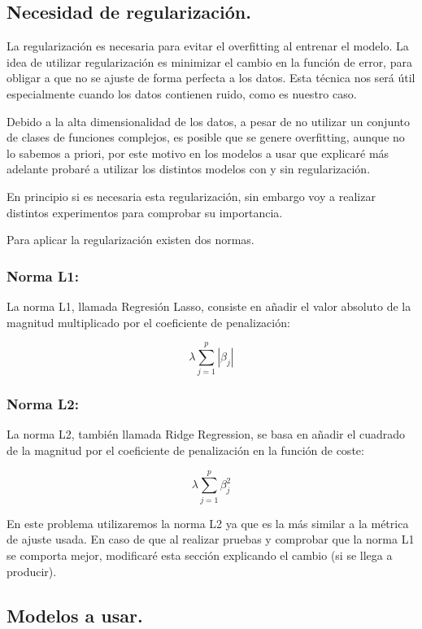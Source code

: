 \documentclass[12pt, spanish]{article}
\begin{document}
\subsection{Necesidad de regularización.}

La regularización es necesaria para evitar el overfitting al entrenar el modelo. La idea de utilizar regularización es minimizar el cambio en la función de error, para obligar a que no se ajuste de forma perfecta a los datos. Esta técnica nos será útil especialmente cuando los datos contienen ruido, como es nuestro caso.

Debido a la alta dimensionalidad de los datos, a pesar de no utilizar un conjunto de clases de funciones complejos, es posible que se genere overfitting, aunque no lo sabemos a priori, por este motivo en los modelos a usar que explicaré más adelante probaré a utilizar los distintos modelos con y sin regularización.

En principio si es necesaria esta regularización, sin embargo voy a realizar distintos experimentos para comprobar su importancia.

Para aplicar la regularización existen dos normas\cite{l1l2regularizacion}.


\subsubsection{Norma L1: }

La norma L1, llamada Regresión Lasso, consiste en añadir el valor absoluto de la magnitud multiplicado por el coeficiente de penalización:

$$ \lambda \sum_{j=1}^{p}{|\beta_j|} $$

\subsubsection{Norma L2:}

La norma L2, también llamada Ridge Regression, se basa en añadir el cuadrado de la magnitud por el coeficiente de penalización en la función de coste:

$$ \lambda \sum_{j=1}^{p}{\beta_j^2} $$


En este problema utilizaremos la norma L2 ya que es la más similar a la métrica de ajuste usada. En caso de que al realizar pruebas y comprobar que la norma L1 se comporta mejor, modificaré esta sección explicando el cambio (si se llega a producir).

\newpage

\subsection{Modelos a usar.}
\end{document}
